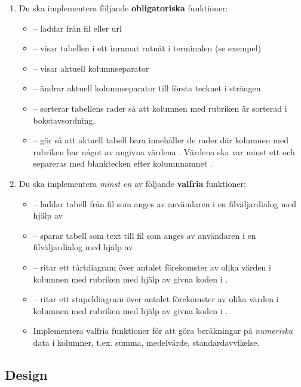 \begin{enumerate}[leftmargin=*]
\item Du ska implementera följande \textbf{obligatoriska} funktioner:
\begin{itemize}[nosep, label={$\square$},]
\item {} -- laddar  från fil eller url
\item {} -- visar tabellen i ett inramat rutnät i terminalen (se exempel)
\item {} -- visar aktuell kolumnseparator
\item {} -- ändrar aktuell kolumnseparator till första tecknet i strängen 
\item {} -- sorterar tabellens rader så att kolumnen med rubriken  är sorterad i bokstavsordning.
\item {} -- gör så att aktuell tabell bara innehåller de rader där kolumnen med rubriken  har något av angivna värdena . Värdena ska var minst ett och separeras med blanktecken efter kolumnnamnet .
\end{itemize}

\item Du ska implementera \emph{minst en} av följande \textbf{valfria} funktioner:
\begin{itemize}[nosep, label={$\square$},]
\item {} -- laddar tabell från fil som anges av användaren i en filväljardialog med hjälp av 
\item {} -- sparar tabell som text till fil som anges av användaren i en filväljardialog med hjälp av 
\item {} -- ritar ett tårtdiagram över antalet förekomster av olika värden i kolumnen med rubriken  med hjälp av givna koden i .
\item {} -- ritar ett stapeldiagram över antalet förekomster av olika värden i kolumnen med rubriken  med hjälp av givna koden i .
\item Implementera valfria funktioner för att göra beräkningar på \emph{numeriska} data i kolumner, t.ex. summa, medelvärde, standardavvikelse.
\end{itemize}

\end{enumerate}

\subsection{Design}

